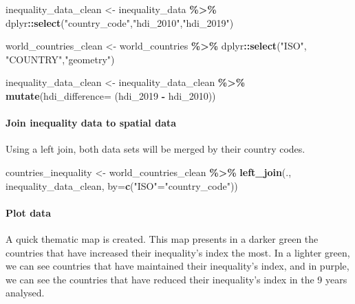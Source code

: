\documentclass[
]{article}
\newenvironment{Shaded}{\begin{snugshade}}{\end{snugshade}}
\newcommand{\AttributeTok}[1]{\textcolor[rgb]{0.13,0.29,0.53}{#1}}
\newcommand{\FunctionTok}[1]{\textcolor[rgb]{0.13,0.29,0.53}{\textbf{#1}}}
\newcommand{\NormalTok}[1]{#1}
\newcommand{\OtherTok}[1]{\textcolor[rgb]{0.56,0.35,0.01}{#1}}
\newcommand{\SpecialCharTok}[1]{\textcolor[rgb]{0.81,0.36,0.00}{\textbf{#1}}}
\newcommand{\StringTok}[1]{\textcolor[rgb]{0.31,0.60,0.02}{#1}}
\begin{document}
\begin{Shaded}
\begin{Highlighting}[]
\NormalTok{inequality\_data\_clean }\OtherTok{\textless{}{-}}\NormalTok{  inequality\_data }\SpecialCharTok{\%\textgreater{}\%}
\NormalTok{  dplyr}\SpecialCharTok{::}\FunctionTok{select}\NormalTok{(}\StringTok{"country\_code"}\NormalTok{,}\StringTok{"hdi\_2010"}\NormalTok{,}\StringTok{"hdi\_2019"}\NormalTok{)}

\NormalTok{world\_countries\_clean }\OtherTok{\textless{}{-}}\NormalTok{ world\_countries }\SpecialCharTok{\%\textgreater{}\%}
\NormalTok{  dplyr}\SpecialCharTok{::}\FunctionTok{select}\NormalTok{(}\StringTok{"ISO"}\NormalTok{, }\StringTok{"COUNTRY"}\NormalTok{,}\StringTok{"geometry"}\NormalTok{)}

\NormalTok{inequality\_data\_clean }\OtherTok{\textless{}{-}}\NormalTok{ inequality\_data\_clean }\SpecialCharTok{\%\textgreater{}\%}
    \FunctionTok{mutate}\NormalTok{(}\AttributeTok{hdi\_difference=}\NormalTok{ (hdi\_2019 }\SpecialCharTok{{-}}\NormalTok{ hdi\_2010))}
\end{Highlighting}
\end{Shaded}

\paragraph{Join inequality data to spatial
data}\label{join-inequality-data-to-spatial-data}

Using a left join, both data sets will be merged by their country codes.

\begin{Shaded}
\begin{Highlighting}[]
\NormalTok{countries\_inequality }\OtherTok{\textless{}{-}}\NormalTok{ world\_countries\_clean }\SpecialCharTok{\%\textgreater{}\%}
  \FunctionTok{left\_join}\NormalTok{(.,}
\NormalTok{            inequality\_data\_clean,}
            \AttributeTok{by=}\FunctionTok{c}\NormalTok{(}\StringTok{"ISO"}\OtherTok{=}\StringTok{"country\_code"}\NormalTok{))}
\end{Highlighting}
\end{Shaded}

\paragraph{Plot data}\label{plot-data}

A quick thematic map is created. This map presents in a darker green the
countries that have increased their inequality's index the most. In a
lighter green, we can see countries that have maintained their
inequality's index, and in purple, we can see the countries that have
reduced their inequality's index in the 9 years analysed.
\end{document}

